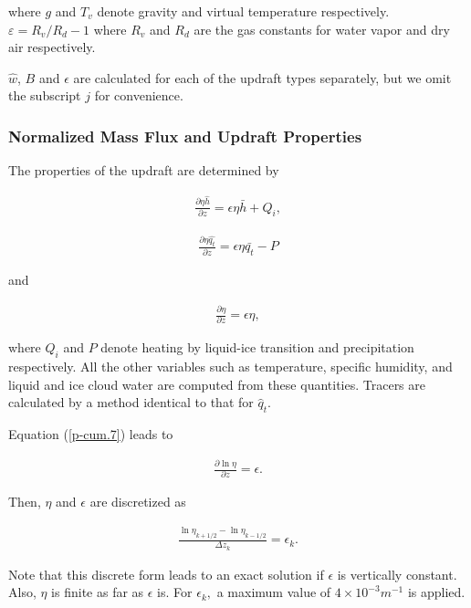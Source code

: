 where \(g\) and \(T_v\) denote gravity and virtual temperature
respectively. \(\varepsilon = R_v/R_d - 1\) where \(R_v\) and \(R_d\)
are the gas constants for water vapor and dry air respectively.

\(\hat{w}\), \(B\) and \(\epsilon\) are calculated for each of the
updraft types separately, but we omit the subscript \(j\) for
convenience.

\hypertarget{normalized-mass-flux-and-updraft-properties}{%
\subsubsection{Normalized Mass Flux and Updraft
Properties}\label{normalized-mass-flux-and-updraft-properties}}

The properties of the updraft are determined by

\begin{eqnarray}
 \frac{\partial \eta \hat{h}}{\partial z} = \epsilon \eta \bar{h} + Q_i, \label{p-cum.5}
\end{eqnarray}

\begin{eqnarray}
 \frac{\partial \eta \hat{q_t}}{\partial z} = \epsilon \eta \bar{q_t} - P \label{p-cum.6}
\end{eqnarray}

and

\begin{eqnarray}
 \frac{\partial \eta}{\partial z} = \epsilon \eta, \label{p-cum.7}
\end{eqnarray}

where \(Q_i\) and \(P\) denote heating by liquid-ice transition and
precipitation respectively. All the other variables such as temperature,
specific humidity, and liquid and ice cloud water are computed from
these quantities. Tracers are calculated by a method identical to that
for \(\hat{q}_t\).

Equation (\ref{p-cum.7}) leads to

\begin{eqnarray}
 \frac{\partial \ln \eta}{\partial z} = \epsilon.
\end{eqnarray}

Then, \(\eta\) and \(\epsilon\) are discretized as

\begin{eqnarray}
 \frac{\ln \eta_{k+1/2} - \ln \eta_{k-1/2}}{\Delta z_k} = \epsilon_k. \label{p-cum.A1}
\end{eqnarray}

Note that this discrete form leads to an exact solution if \(\epsilon\)
is vertically constant. Also, \(\eta\) is finite as far as \(\epsilon\)
is. For \(\epsilon_k,\) a maximum value of \(4 \times 10^{-3} m^{-1}\)
is applied.

